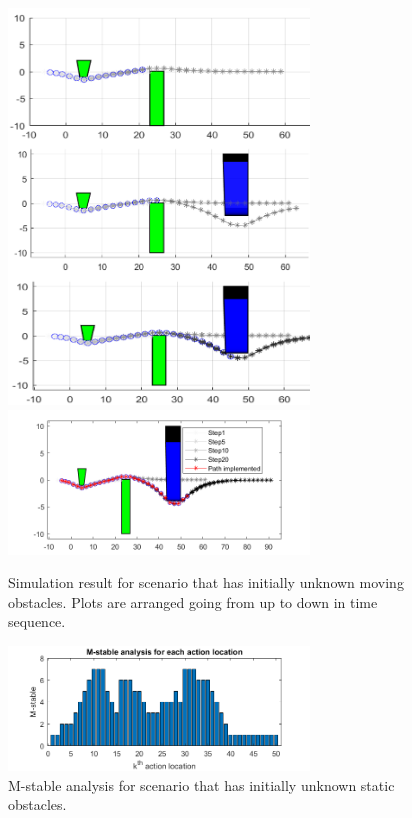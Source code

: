 \documentclass{ifacconf}
\begin{document}
\begin{figure}[htbp]
\begin{center}
\includegraphics[width=8cm]{src/3_1_1.png}
\includegraphics[width=8cm]{src/3_1_4.png}
\caption{Simulation result for scenario that has initially unknown moving obstacles. Plots are arranged going from up to down in time sequence.}
\label{fig: mpc}
\end{center}
\end{figure}

\begin{figure}[htbp]
\begin{center}
\includegraphics[width=8cm]{src/3_2_1_M-stable.png}
\caption{M-stable analysis for scenario that has initially unknown static obstacles. }
\label{fig: mpc}
\end{center}
\end{figure}
\end{document}
